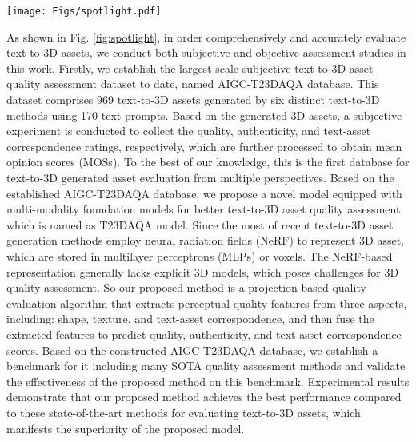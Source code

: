 \begin{figure*}[t]
    \centering
    \texttt{[image: Figs/spotlight.pdf]}
    \caption{\color{black}{An Overview of the established AIGC-T23DAQA database and the proposed T23DAQA method. AIGC-T23DAQA database is the first and the largest text-to-3d assets quality assessment database. This database encompasses 969 validated 3D assets generated from 170 prompts via 6 popular text-to-3D asset generation models, and corresponding subjective quality ratings. In addition, we popose a T23DAQA method to predict the text-to-3D asset quality from three aspects: shape, texture, and correspondence. The proposed method achieves the state-of-the-art performance in evaluating the perceptual attributes of text-to-3d assets.}}
    \label{fig:spotlight}
    \vspace{-0.5cm}
\end{figure*}
As shown in Fig. \ref{fig:spotlight}, in order comprehensively and accurately evaluate text-to-3D assets, we conduct both subjective and objective assessment studies in this work. Firstly, we establish the largest-scale subjective text-to-3D asset quality assessment dataset to date, named AIGC-T23DAQA database. This dataset comprises 969 text-to-3D assets generated by six distinct text-to-3D methods using 170 text prompts. Based on the generated 3D assets, a subjective experiment is conducted to collect the quality, authenticity, and text-asset correspondence ratings, respectively, which are further processed to obtain mean opinion scores (MOSs).  To the best of our knowledge, this is the first database for text-to-3D generated asset evaluation from multiple perspectives.
Based on the established AIGC-T23DAQA database, we propose a novel model equipped with multi-modality foundation models for better text-to-3D asset quality assessment, which is named as T23DAQA model. Since the most of recent text-to-3D asset generation methods employ neural radiation fields (NeRF) to represent 3D asset, which are stored in multilayer perceptrons (MLPs) or voxels. The NeRF-based representation generally lacks explicit 3D models, which poses challenges for 3D quality assessment. So our proposed method is a projection-based quality evaluation algorithm that extracts perceptual quality features from three aspects, including: shape, texture, and text-asset correspondence, and then fuse the extracted features to predict quality, authenticity, and text-asset correspondence scores. Based on the constructed AIGC-T23DAQA database, we establish a benchmark for it including many SOTA quality assessment methods and validate the effectiveness of the proposed method on this benchmark. Experimental results demonstrate that our proposed method achieves the best performance compared to these state-of-the-art methods for evaluating text-to-3D assets, which manifests the superiority of the proposed model.

